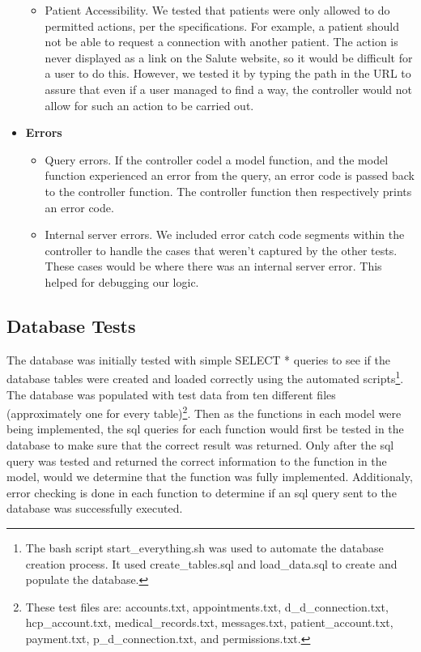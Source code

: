 \documentclass[12pt]{report}
\begin{document}
\begin{itemize}
\begin{itemize}
\item Patient Accessibility. We tested that patients were only allowed to do permitted actions, per the specifications. For example, a patient should not be able to request a connection with another patient. The action is never displayed as a link on the Salute website, so it would be difficult for a user to do this. However, we tested it by typing the path in the URL to assure that even if a user managed to find a way, the controller would not allow for such an action to be carried out. 
\end{itemize}
\item \textbf{Errors}
\begin{itemize} 
\item Query errors. If the controller codel a model function, and the model function experienced an error from the query, an error code is passed back to the controller function. The controller function then respectively prints an error code. 
\item Internal server errors. We included error catch code segments within the controller to handle the cases that weren't captured by the other tests. These cases would be where there was an internal server error. This helped for debugging our logic.  
\end{itemize}
\end{itemize}


\subsection{Database Tests}
The database was initially tested with simple SELECT * queries to see if the database tables were created and loaded correctly using the automated scripts\footnote{The bash script start\_everything.sh was used to automate the database creation process.  It used create\_tables.sql and load\_data.sql to create and populate the database.}. The database was populated with test data from ten different files (approximately one for every table)\footnote{These test files are: accounts.txt, appointments.txt, d\_d\_connection.txt, hcp\_account.txt, medical\_records.txt, messages.txt, patient\_account.txt, payment.txt, p\_d\_connection.txt, and permissions.txt.}.  Then as the functions in each model were being implemented, the sql queries for each function would first be tested in the database to make sure that the correct result was returned.  Only after the sql query was tested and returned the correct information to the function in the model, would we determine that the function was fully implemented.  Additionaly, error checking is done in each function to determine if an sql query sent to the database was successfully executed.
\end{document}
